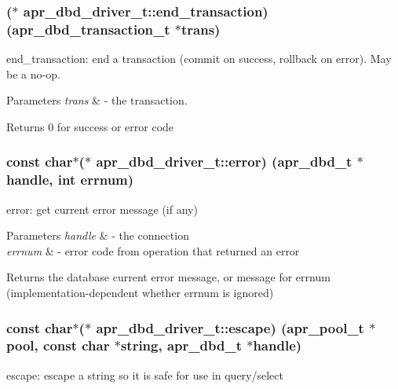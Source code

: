 \subsubsection[{\texorpdfstring{end\+\_\+transaction}{end_transaction}}]{($\ast$ apr\+\_\+dbd\+\_\+driver\+\_\+t\+::end\+\_\+transaction) ({\bf apr\+\_\+dbd\+\_\+transaction\+\_\+t} $\ast${\bf trans})}\hypertarget{structapr__dbd__driver__t_a8ec55cbddf69f4d371017d0c985abe76}{}\label{structapr__dbd__driver__t_a8ec55cbddf69f4d371017d0c985abe76}
end\+\_\+transaction\+: end a transaction (commit on success, rollback on error). May be a no-\/op.


\begin{DoxyParams}{Parameters}
{\em trans} & -\/ the transaction. \\
\hline
\end{DoxyParams}
\begin{DoxyReturn}{Returns}
0 for success or error code 
\end{DoxyReturn}
\subsubsection[{\texorpdfstring{error}{error}}]{\setlength{\rightskip}{0pt plus 5cm}const char$\ast$($\ast$ apr\+\_\+dbd\+\_\+driver\+\_\+t\+::error) ({\bf apr\+\_\+dbd\+\_\+t} $\ast${\bf handle}, {\bf int} {\bf errnum})}\hypertarget{structapr__dbd__driver__t_a96a1e0b8f3790421e1027671a51ca698}{}\label{structapr__dbd__driver__t_a96a1e0b8f3790421e1027671a51ca698}
error\+: get current error message (if any)


\begin{DoxyParams}{Parameters}
{\em handle} & -\/ the connection \\
\hline
{\em errnum} & -\/ error code from operation that returned an error \\
\hline
\end{DoxyParams}
\begin{DoxyReturn}{Returns}
the database current error message, or message for errnum (implementation-\/dependent whether errnum is ignored) 
\end{DoxyReturn}
\subsubsection[{\texorpdfstring{escape}{escape}}]{\setlength{\rightskip}{0pt plus 5cm}const char$\ast$($\ast$ apr\+\_\+dbd\+\_\+driver\+\_\+t\+::escape) ({\bf apr\+\_\+pool\+\_\+t} $\ast${\bf pool}, const char $\ast${\bf string}, {\bf apr\+\_\+dbd\+\_\+t} $\ast${\bf handle})}\hypertarget{structapr__dbd__driver__t_a60deca4d8496e4ce2a4526c7a5733839}{}\label{structapr__dbd__driver__t_a60deca4d8496e4ce2a4526c7a5733839}
escape\+: escape a string so it is safe for use in query/select


